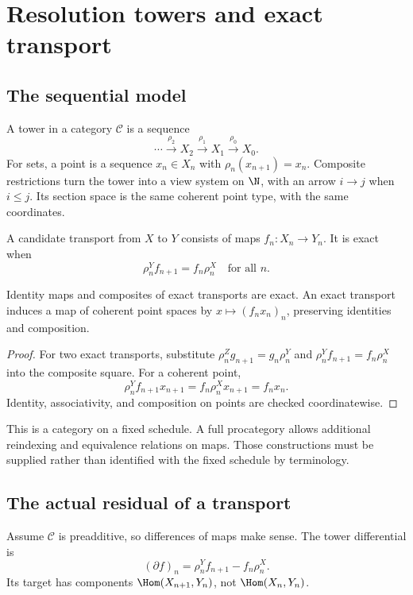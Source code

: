 \section{Resolution towers and exact transport}\label{sec:towers}
\subsection{The sequential model}
A tower in a category \(\mathcal C\) is a sequence
\[
 \cdots\xrightarrow{\rho_2}X_2\xrightarrow{\rho_1}X_1
 \xrightarrow{\rho_0}X_0.
\]
For sets, a point is a sequence \(x_n\in X_n\) with \(\rho_n(x_{n+1})=x_n\). Composite restrictions turn the tower into a view system on \(\N\), with an arrow \(i\to j\) when \(i\le j\). Its section space is the same coherent point type, with the same coordinates.

A candidate transport from \(X\) to \(Y\) consists of maps \(f_n:X_n\to Y_n\). It is exact when
\begin{equation}\label{eq:exacttower}
 \rho^Y_n f_{n+1}=f_n\rho^X_n\quad\text{for all }n.
\end{equation}

\begin{proposition}\label{KS16}
Identity maps and composites of exact transports are exact. An exact transport induces a map of coherent point spaces by \(x\mapsto(f_nx_n)_n\), preserving identities and composition.
\end{proposition}
\begin{proof}
For two exact transports, substitute \(\rho^Z_ng_{n+1}=g_n\rho^Y_n\) and \(\rho^Y_nf_{n+1}=f_n\rho^X_n\) into the composite square. For a coherent point,
\[
 \rho^Y_n f_{n+1}x_{n+1}
 =f_n\rho^X_nx_{n+1}=f_nx_n.
\]
Identity, associativity, and composition on points are checked coordinatewise.
\end{proof}
This is a category on a fixed schedule. A full procategory allows additional reindexing and equivalence relations on maps. Those constructions must be supplied rather than identified with the fixed schedule by terminology.

\subsection{The actual residual of a transport}
Assume \(\mathcal C\) is preadditive, so differences of maps make sense. The tower differential is
\[
 (\partial f)_n=\rho^Y_nf_{n+1}-f_n\rho^X_n.
\]
Its target has components \(\Hom(X_{n+1},Y_n)\), not \(\Hom(X_n,Y_n)\).

